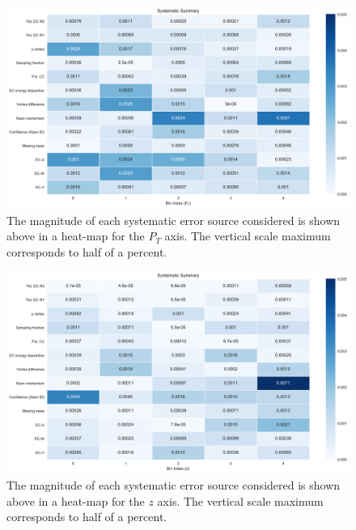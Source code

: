 \begin{figure}
	\label{fig:systematic_heatmap_pt}
	\begin{center}
		\includegraphics[width=\textwidth]{image/plots/kaon-bsa/systematics_integrated_heatmap_pt.pdf}
		\caption{The magnitude of each systematic error source considered is shown above in a heat-map for the $P_T$ axis.  The vertical scale maximum corresponds to half of a percent.}
	\end{center}
\end{figure}

\begin{figure}
	\label{fig:systematic_heatmap_z}
	\begin{center}
		\includegraphics[width=\textwidth]{image/plots/kaon-bsa/systematics_integrated_heatmap_z.pdf}
		\caption{The magnitude of each systematic error source considered is shown above in a heat-map for the $z$ axis.  The vertical scale maximum corresponds to half of a percent.}
	\end{center}
\end{figure}

